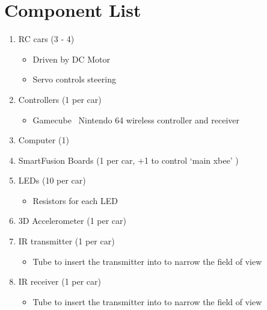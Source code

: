 \documentclass{article}
\begin{document}
\section{Component List}
\begin{enumerate}
    \item RC cars (3 - 4)
        \begin{itemize}
            \item Driven by DC Motor
            \item Servo controls steering
        \end{itemize}
    \item Controllers (1 per car)
        \begin{itemize}
            \item Gamecube \ Nintendo 64 wireless controller and receiver
        \end{itemize}
    \item Computer (1)
    \item SmartFusion Boards (1 per car, +1 to control ‘main xbee’ )
    \item LEDs (10 per car)
        \begin{itemize}
            \item Resistors for each LED
        \end{itemize}
    \item 3D Accelerometer (1 per car)
    \item IR transmitter (1 per car)
        \begin{itemize}
            \item Tube to insert the transmitter into to narrow the field of
            view
        \end{itemize}
    \item IR receiver (1 per car)
        \begin{itemize}
            \item Tube to insert the transmitter into to narrow the field of
            view
        \end{itemize}
\end{enumerate}
\end{document}
